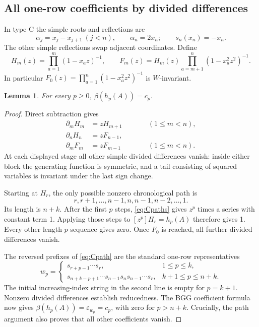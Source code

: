 \documentclass[11pt,letterpaper]{article}
\newtheorem{lemma}[theorem]{Lemma}
\theoremstyle{remark}
\newcommand{\eps}{\varepsilon}
\begin{document}
\subsection{All one-row coefficients by divided differences}
In type C the simple roots and reflections are
\[
 \alpha_j=x_j-x_{j+1}\ (j<n),\qquad \alpha_n=2x_n;
 \qquad s_n(x_n)=-x_n.
\]
The other simple reflections swap adjacent coordinates. Define
\[
 H_m(z)=\prod_{a=1}^{m}(1-x_a z)^{-1},\qquad
 F_m(z)=H_m(z)\prod_{a=m+1}^{n}(1-x_a^2z^2)^{-1}.
\]
In particular $F_0(z)=\prod_{a=1}^n(1-x_a^2z^2)^{-1}$ is $W$-invariant.

\begin{lemma}\label{lem:Crows}
For every $p\geq0$, $\beta(h_p(A))=c_p$.
\end{lemma}
\begin{proof}
Direct subtraction gives
\begin{align}
 \partial_mH_m&=zH_{m+1} &&(1\leq m<n),\nonumber\\
 \partial_nH_n&=zF_{n-1},&\qquad&\nonumber\\
 \partial_mF_m&=zF_{m-1} &&(1\leq m<n).
 \label{eq:Cpaths}
\end{align}
At each displayed stage all other simple divided differences vanish: inside either block the generating function is symmetric, and a tail consisting of squared variables is invariant under the last sign change.

Starting at $H_r$, the only possible nonzero chronological path is
\begin{equation}
 r,r+1,\ldots,n-1,n,n-1,n-2,\ldots,1.
 \label{eq:Cpath}
\end{equation}
Its length is $n+k$. After the first $p$ steps, \eqref{eq:Cpaths} gives $z^p$ times a series with constant term 1. Applying those steps to $[z^p]H_r=h_p(A)$ therefore gives 1. Every other length-$p$ sequence gives zero. Once $F_0$ is reached, all further divided differences vanish.

The reversed prefixes of \eqref{eq:Cpath} are the standard one-row representatives
\begin{equation}
 w_p=
 \begin{cases}
 s_{r+p-1}\cdots s_r,&1\leq p\leq k,\\[2pt]
 s_{n+k-p+1}\cdots s_{n-1}s_ns_{n-1}\cdots s_r,
       &k+1\leq p\leq n+k.
 \end{cases}
 \label{eq:Cwords}
\end{equation}
The initial increasing-index string in the second line is empty for $p=k+1$. Nonzero divided differences establish reducedness. The BGG coefficient formula now gives $\beta(h_p(A))=\eps_{w_p}=c_p$, with zero for $p>n+k$. Crucially, the path argument also proves that all other coefficients vanish.
\end{proof}
\end{document}
